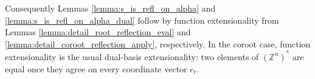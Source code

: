 Consequently Lemmas \ref{lemma:s_is_refl_on_alpha} and
\ref{lemma:s_is_refl_on_alpha_dual} follow by function extensionality
from Lemmas \ref{lemma:detail_root_reflection_eval} and
\ref{lemma:detail_coroot_reflection_apply}, respectively.  In the coroot
case, function extensionality is the usual dual-basis extensionality:
two elements of $(\mathbb Z^n)^*$ are equal once they agree on every
coordinate vector $e_t$.
